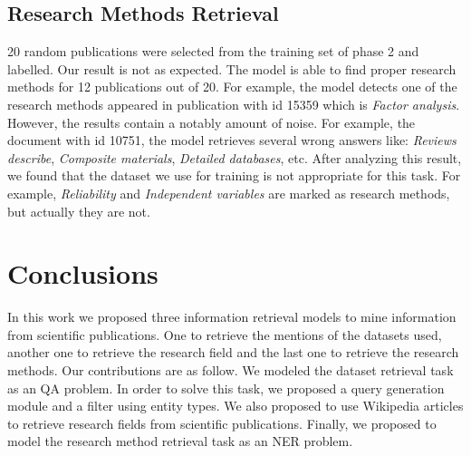 \documentclass[11pt]{article}
\begin{document}

\subsection{Research Methods Retrieval}
20 random publications were selected from the training set of phase 2 and labelled. Our result is not as expected. The model is able to find proper research methods for 12 publications out of 20. For example, the model detects one of the research methods appeared in publication with id 15359 which is \textit{Factor analysis}. However, the results contain a notably amount of noise. For example, the document with id 10751, the model retrieves several wrong answers like: \textit{Reviews describe}, \textit{Composite materials}, \textit{Detailed databases}, etc. After analyzing this result, we found that the dataset we use for training is not appropriate for this task. For example, \textit{Reliability} and \textit{Independent variables} are marked as research methods, but actually they are not.

\section{Conclusions}
In this work we proposed three information retrieval models to mine information from scientific publications. One to retrieve the mentions of the datasets used, another one to retrieve the research field and the last one to retrieve the research methods. Our contributions are as follow. We modeled the dataset retrieval task as an QA problem. In order to solve this task, we proposed a query generation module and a filter using entity types. We also proposed to use Wikipedia articles to retrieve research fields from scientific publications. Finally, we proposed to model the research method retrieval task as an NER problem.
\end{document}
